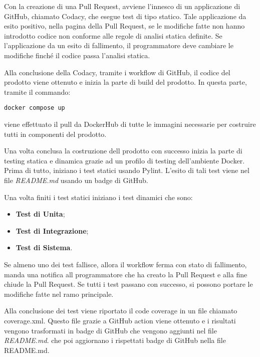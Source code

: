 Con la creazione di una Pull Request, avviene l'innesco di un applicazione di GitHub, chiamato Codacy, che esegue test di tipo statico. Tale applicazione da esito positivo, nella pagina della Pull Request, se le modifiche fatte non hanno introdotto codice non conforme alle regole di analisi statica definite. Se l'applicazione da un esito di fallimento, il programmatore deve cambiare le modifiche finché il codice passa l'analisi statica.

\vspace{0.2cm}

Alla conclusione della Codacy, tramite i workflow di GitHub, il codice del prodotto viene ottenuto e inizia la parte di build del prodotto. In questa parte, tramite il commando:
\begin{lstlisting}[style=code]
    docker compose up
\end{lstlisting}
viene effettuato il pull da DockerHub di tutte le immagini necessarie per costruire tutti in componenti del prodotto.

\vspace{0.2cm}

Una volta conclusa la costruzione dell prodotto con successo inizia la parte di testing statica e dinamica grazie ad un profilo di testing dell'ambiente Docker. Prima di tutto, iniziano i test statici usando Pylint. L'esito di tali test viene nel file \textit{README.md} usando un badge di GitHub.

\vspace{0.2cm}

Una volta finiti i test statici iniziano i test dinamici che sono:

\begin{itemize}
    \item \textbf{Test di Unita};
    \item \textbf{Test di Integrazione};
    \item \textbf{Test di Sistema}.
\end{itemize}

Se almeno uno dei test fallisce, allora il workflow ferma con stato di fallimento, manda una notifica all programmatore che ha creato la Pull Request e alla fine chiude la Pull Request. Se tutti i test passano con successo, si possono portare le modifiche fatte nel ramo principale.

\vspace{0.2cm}

Alla conclusione dei test viene riportato il code coverage in un file chiamato coverage.xml. Questo file grazie a GitHub action viene ottenuto e i risultati vengono trasformati in badge di GitHub che vengono aggiunti nel file \textit{README.md}.
che poi aggiornano i rispettati badge di GitHub nella file README.md.


